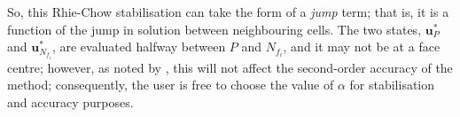 \documentclass[sn-mathphys,Numbered]{sn-jnl}%
\newcommand{\bb}{\boldsymbol}
\begin{document}
\begin{appendices}
So, this Rhie-Chow stabilisation can take the form of a \emph{jump} term; that is, it is a function of the jump in solution between neighbouring cells.
The two states, $\bb{u}_P^*$ and $\bb{u}_{N_{f_i}}^*$, are evaluated halfway between $P$ and $N_{f_i}$, and it may not be at a face centre; however, as noted by \citet{Nishikawa2010}, this will not affect the second-order accuracy of the method; consequently, the user is free to choose the value of $\alpha$ for stabilisation and accuracy purposes.




\end{appendices}
\end{document}
